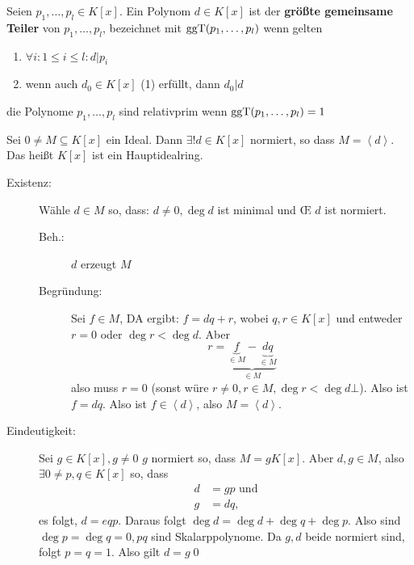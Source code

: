 \begin{subdefinition}
	Seien $ p_1, \dotsc, p_l \in K[x] $.
	Ein Polynom $ d \in K[x] $ ist der \textbf{größte gemeinsame Teiler} von $ p_1, \dotsc, p_l $, bezeichnet mit $ \operatorname{ggT}(p_1, \dotsc, p_l) $ wenn gelten
	\begin{enumerate}[label=(\arabic*)]
		\item $ \forall i : 1 \leq i \leq l : d | p_i $
		\item wenn auch $ d_0 \in K[x] $ (1) erfüllt, dann $ d_0 | d $
	\end{enumerate}
\end{subdefinition}

\begin{subdefinition}
	die Polynome $ p_1, \dotsc, p_l $ sind relativprim wenn $ \operatorname{ggT}(p_1, \dotsc, p_l) = 1 $
\end{subdefinition}

\begin{subtheorem}
	Sei $ 0 \neq M \subseteq K[x] $ ein Ideal.
	Dann $ \exists ! d \in K[x] $ normiert, so dass $ M = \left< d \right> $.
	Das heißt $ K[x] $ ist ein Hauptidealring.
\end{subtheorem}
\begin{subproof*}
	\begin{description}
		\item[Existenz:] Wähle $ d \in M $ so, dass: $ d \neq 0, \deg d $ ist minimal und \OE{} $ d $ ist normiert.
			\begin{description}
				\item[Beh.:] $ d $ erzeugt $ M $ 
				\item[Begründung:] Sei $ f \in M $, DA ergibt: $ f = dq + r $, wobei $ q, r \in K[x] $ und entweder $ r = 0 $ oder $ \deg r < \deg d $.
					Aber
					\[
						r = \underbrace{\underbrace{f}_{\in M} - \underbrace{dq}_{\in M}}_{\in M}
					\]
					also muss $ r = 0 $ (sonst würe $ r \neq 0, r \in M, \deg r < \deg d \bot $).
					Also ist $ f = dq $.
					Also ist $ f \in \left<d \right> $, also $ M = \left< d \right> $.
			\end{description}
		\item[Eindeutigkeit:]
			Sei $ g \in K[x], g \neq 0 $ $ g $ normiert so, dass $ M = gK[x] $.
			Aber $ d,g \in M $, also $ \exists 0 \neq p, q \in K[x] $ so, dass
			\begin{align*}
				d &= g p \text{ und}  \\
				g &= d q,
			\end{align*}
			es folgt, $ d = eqp $.
			Daraus folgt $ \deg d = \deg d + \deg q + \deg p $.
			Also sind $ \deg p = \deg q = 0, pq $ sind Skalarppolynome.
			Da $ g, d $ beide normiert sind, folgt $ p = q = 1 $.
			Also gilt $ d = g $\qed
	\end{description}
	
\end{subproof*}


